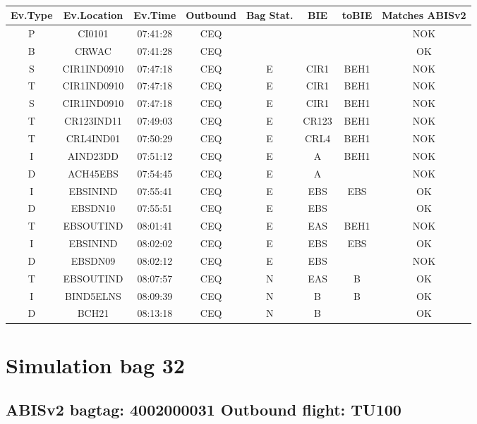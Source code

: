 \documentclass{report}
\begin{document}
\paragraph{}
\begin{longtable}{cccccccc}    \toprule
\rowcolor{white!50}
\textbf{Ev.Type} & \textbf{Ev.Location} & \textbf{Ev.Time} & \textbf{Outbound} & \textbf{Bag Stat.} & \textbf{BIE} & \textbf{toBIE} & \textbf{Matches ABISv2} \\\midrule
P & CI0101 & 07:41:28  & CEQ &  &  &  & NOK\\
B & CRWAC & 07:41:28  & CEQ &  &  &  & OK\\
S & CIR1IND0910 & 07:47:18  & CEQ & E & CIR1 & BEH1 & NOK\\
T & CIR1IND0910 & 07:47:18  & CEQ & E & CIR1 & BEH1 & NOK\\
S & CIR1IND0910 & 07:47:18  & CEQ & E & CIR1 & BEH1 & NOK\\
T & CR123IND11 & 07:49:03  & CEQ & E & CR123 & BEH1 & NOK\\
T & CRL4IND01 & 07:50:29  & CEQ & E & CRL4 & BEH1 & NOK\\
I & AIND23DD & 07:51:12  & CEQ & E & A & BEH1 & NOK\\
D & ACH45EBS & 07:54:45  & CEQ & E & A &  & NOK\\
I & EBSININD & 07:55:41  & CEQ & E & EBS & EBS & OK\\
D & EBSDN10 & 07:55:51  & CEQ & E & EBS &  & OK\\
T & EBSOUTIND & 08:01:41  & CEQ & E & EAS & BEH1 & NOK\\
I & EBSININD & 08:02:02  & CEQ & E & EBS & EBS & OK\\
D & EBSDN09 & 08:02:12  & CEQ & E & EBS &  & NOK\\
T & EBSOUTIND & 08:07:57  & CEQ & N & EAS & B & OK\\
I & BIND5ELNS & 08:09:39  & CEQ & N & B & B & OK\\
D & BCH21 & 08:13:18  & CEQ & N & B &  & OK\\
\bottomrule
\end{longtable}
\pagebreak
\section*{Simulation bag 32}
\subsection*{ABISv2 bagtag: 4002000031 Outbound flight: TU100}
\end{document}
